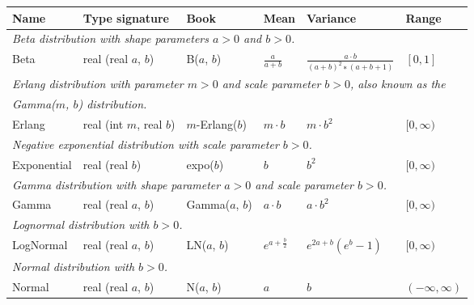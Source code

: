 \begin{table}[t]
  \begin{center}
  \begin{tabular}{|l l l l l l|} \hline
    \textbf{Name} & \textbf{Type signature} & \textbf{Book} & \textbf{Mean} &
        \textbf{Variance} & \textbf{Range} \\

    \hline
    \multicolumn{6}{|l|}{\emph{Beta distribution with shape parameters $a>0$
                               and $b>0$.}} \\
    Beta &
    real (real $a$, $b$) &
    B($a$, $b$) &
    $\frac{a}{a+b}$ &
    $\frac{a\cdot{}b}{(a+b)^2∗(a+b+1)}$ &
    $[0,1]$ \\[2pt]

    \hline
    \multicolumn{6}{|l|}{\emph{Erlang distribution with parameter $m>0$ and
                               scale parameter $b>0$, also known as the}} \\
    \multicolumn{6}{|l|}{\emph{Gamma($m$, $b$) distribution.}} \\
    Erlang &
    real (int $m$, real $b$) &
    $m$-Erlang($b$) &
    $m\cdot{}b$ &
    $m\cdot{}b^2$ &
    $[0,\infty)$ \\[2pt]

    \hline
    \multicolumn{6}{|l|}{\emph{Negative exponential distribution with scale
                               parameter $b>0$.}} \\
    Exponential &
    real (real $b$) &
    expo($b$) &
    $b$ &
    $b^2$ &
    $[0,\infty)$ \\[2pt]

    \hline
    \multicolumn{6}{|l|}{\emph{Gamma distribution with shape parameter $a>0$
                               and scale parameter $b>0$.}} \\
    Gamma &
    real (real $a$, $b$) &
    Gamma($a$, $b$) &
    $a\cdot{}b$ &
    $a\cdot{}b^2$ &
    $[0,\infty)$ \\[2pt]

    \hline
    \multicolumn{6}{|l|}{\emph{Lognormal distribution with $b>0$.}} \\
    LogNormal &
    real (real $a$, $b$) &
    LN($a$, $b$) &
    $e^{a+\frac{b}{2}}$ &
    $e^{2a+b}(e^b-1)$ &
    $[0,\infty)$ \\[2pt]

    \hline
    \multicolumn{6}{|l|}{\emph{Normal distribution with $b>0$.}} \\
    Normal &
    real (real $a$, $b$) &
    N($a$, $b$) &
    $a$ &
    $b$ &
    $(-\infty,\infty)$ \\[2pt]


\end{tabular}
\end{center}
\end{table}
